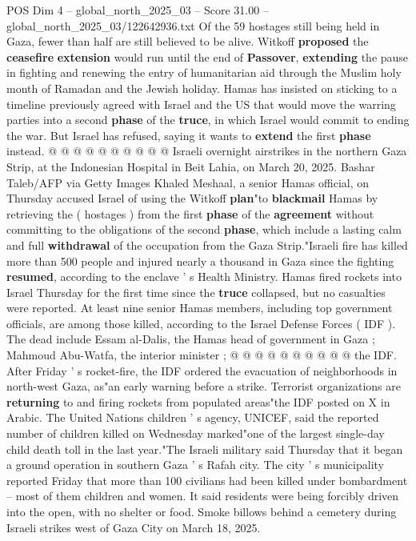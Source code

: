 \begin{textsample}{POS Dim 4 – global\_north\_2025\_03 – Score 31.00 – global\_north\_2025\_03/122642936.txt}
Of the 59 hostages still being held in Gaza, fewer than half are still believed to be alive.
Witkoff \textbf{proposed} the \textbf{ceasefire} \textbf{extension} would run until the end of \textbf{Passover}, \textbf{extending} the pause in fighting and renewing the entry of humanitarian aid through the Muslim holy month of Ramadan and the Jewish holiday.
Hamas has insisted on sticking to a timeline previously agreed with Israel and the US that would move the warring parties into a second \textbf{phase} of the \textbf{truce}, in which Israel would commit to ending the war.
But Israel has refused, saying it wants to \textbf{extend} the first \textbf{phase} instead. @ @ @ @ @ @ @ @ @ @ Israeli overnight airstrikes in the northern Gaza Strip, at the Indonesian Hospital in Beit Lahia, on March 20, 2025.
Bashar Taleb/AFP via Getty Images Khaled Meshaal, a senior Hamas official, on Thursday accused Israel of using the Witkoff \textbf{plan}"to \textbf{blackmail} Hamas by retrieving the ( hostages ) from the first \textbf{phase} of the \textbf{agreement} without committing to the obligations of the second \textbf{phase}, which include a lasting calm and full \textbf{withdrawal} of the occupation from the Gaza Strip."Israeli fire has killed more than 500 people and injured nearly a thousand in Gaza since the fighting \textbf{resumed}, according to the enclave ' s Health Ministry.
Hamas fired rockets into Israel Thursday for the first time since the \textbf{truce} collapsed, but no casualties were reported.
At least nine senior Hamas members, including top government officials, are among those killed, according to the Israel Defense Forces ( IDF ).
The dead include Essam al-Dalis, the Hamas head of government in Gaza ; Mahmoud Abu-Watfa, the interior minister ; @ @ @ @ @ @ @ @ @ @ the IDF.
After Friday ' s rocket-fire, the IDF ordered the evacuation of neighborhoods in north-west Gaza, as"an early warning before a strike.
Terrorist organizations are \textbf{returning} to and firing rockets from populated areas"the IDF posted on X in Arabic.
The United Nations children ' s agency, UNICEF, said the reported number of children killed on Wednesday marked"one of the largest single-day child death toll in the last year."The Israeli military said Thursday that it began a ground operation in southern Gaza ' s Rafah city.
The city ' s municipality reported Friday that more than 100 civilians had been killed under bombardment -- most of them children and women.
It said residents were being forcibly driven into the open, with no shelter or food.
Smoke billows behind a cemetery during Israeli strikes west of Gaza City on March 18, 2025.

\end{textsample}
